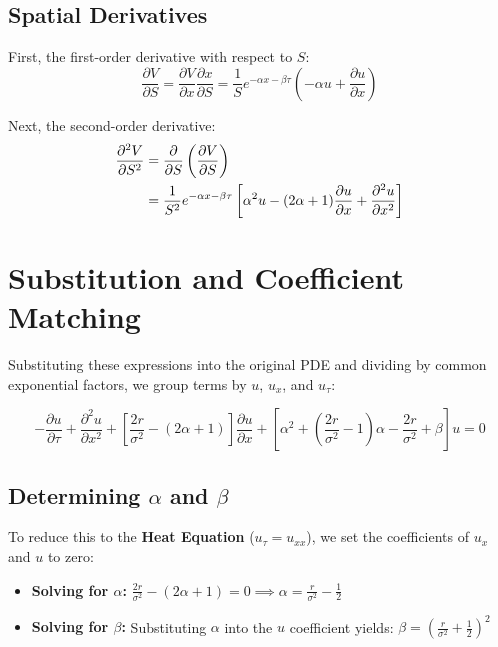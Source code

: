 \documentclass[11pt,a4paper]{article}
\begin{document}
\subsection{Spatial Derivatives}
First, the first-order derivative with respect to $S$:
\begin{equation}
\frac{\partial V}{\partial S} = \frac{\partial V}{\partial x} \frac{\partial x}{\partial S} = \frac{1}{S} e^{-\alpha x - \beta \tau} \left( -\alpha u + \frac{\partial u}{\partial x} \right)
\end{equation}

Next, the second-order derivative:
\begin{align}
\frac{\partial^2 V}{\partial S^2} &= \frac{\partial}{\partial S} \left( \frac{\partial V}{\partial S} \right) \notag \\
&= \frac{1}{S^2} e^{-\alpha x - \beta \tau} \left[ \alpha^2 u - (2\alpha+1)\frac{\partial u}{\partial x} + \frac{\partial^2 u}{\partial x^2} \right]
\end{align}

\section{Substitution and Coefficient Matching}
Substituting these expressions into the original PDE and dividing by common exponential factors, we group terms by $u$, $u_x$, and $u_\tau$:

\begin{equation}
-\frac{\partial u}{\partial \tau} + \frac{\partial^2 u}{\partial x^2} + \left[ \frac{2r}{\sigma^2} - (2\alpha + 1) \right] \frac{\partial u}{\partial x} + \left[ \alpha^2 + \left(\frac{2r}{\sigma^2} - 1\right)\alpha - \frac{2r}{\sigma^2} + \beta \right] u = 0
\end{equation}

\subsection{Determining $\alpha$ and $\beta$}
To reduce this to the \textbf{Heat Equation} ($u_\tau = u_{xx}$), we set the coefficients of $u_x$ and $u$ to zero:

\begin{itemize}
    \item \textbf{Solving for $\alpha$:} 
    $ \frac{2r}{\sigma^2} - (2\alpha + 1) = 0 \implies \alpha = \frac{r}{\sigma^2} - \frac{1}{2} $
    
    \item \textbf{Solving for $\beta$:} 
    Substituting $\alpha$ into the $u$ coefficient yields:
    $ \beta = \left( \frac{r}{\sigma^2} + \frac{1}{2} \right)^2 $
\end{itemize}
\end{document}
